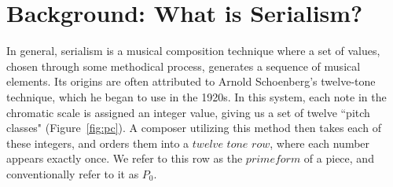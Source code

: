\section{Background: What is Serialism?}

In general, serialism is a musical composition technique where a set of values, chosen 
through some methodical process, generates a sequence of musical elements. 
Its origins are often attributed to Arnold Schoenberg's twelve-tone technique, which
he began to use in the 1920s. In this system, each note in the chromatic scale 
is assigned an integer value, giving us a set of twelve ``pitch classes" (Figure~\ref{fig:pc}).
A composer utilizing this method then takes each of these integers, and orders 
them into a $twelve$ $tone$ $row$, where each number appears exactly once. We refer to 
this row as the $prime form$ of a piece, and conventionally refer to it as $P_0$. 

